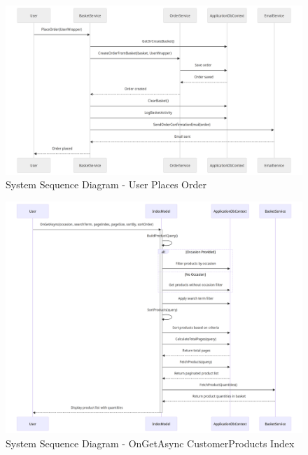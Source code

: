 \begin{figure}
    \centering
    \includegraphics[width=1\textwidth]{figures/diagrams/ssd-user-places-an-order.png}
    \caption{System Sequence Diagram - User Places Order}
    \label{fig:ssd-user-places-order}
\end{figure}

\begin{figure}
    \centering
    \includegraphics[width=1\textwidth]{figures/diagrams/ssd-ongetasync-customerproducts-index.png}
    \caption{System Sequence Diagram - OnGetAsync CustomerProducts Index}
    \label{fig:ssd-ongetasync-customerproducts-index}
\end{figure}

